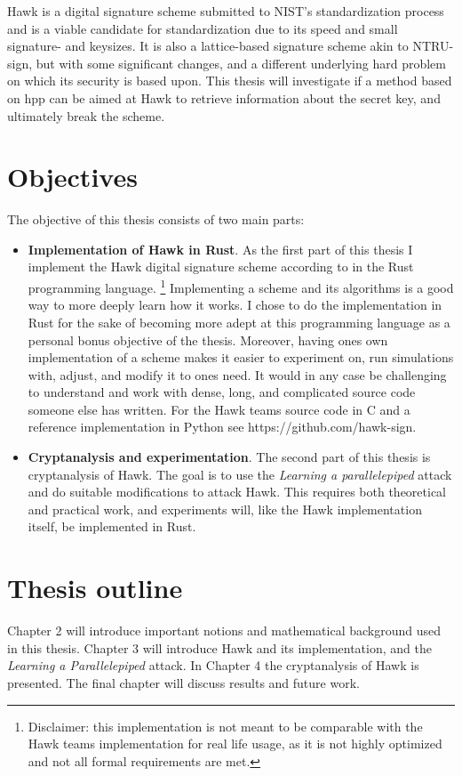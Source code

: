 Hawk \cite{HawkSpec24} is a digital signature scheme submitted to NIST's standardization process and is a viable candidate for standardization
due to its speed and small signature- and keysizes. It is also a lattice-based signature scheme akin to NTRU-sign, but with some significant changes, and a different underlying hard problem on which its security is based upon. 
This thesis will investigate if a method based on \gls{hpp} can be aimed at Hawk to retrieve information about the secret key, and ultimately break the scheme.

\section{Objectives}
The objective of this thesis consists of two main parts:
\begin{itemize}
    \item \textbf{Implementation of Hawk in Rust}. As the first part of this thesis I implement the Hawk digital signature scheme according to \cite{HawkSpec24} in the Rust programming language.
        \footnote{Disclaimer: this implementation is not meant to be comparable with the Hawk teams implementation for real life usage, as it is not highly optimized and not all formal requirements are met.}
    Implementing a scheme and its algorithms is a good way to more deeply learn how it works. I chose to do the implementation in Rust for the sake of becoming more adept at this programming language as a personal bonus objective of the thesis.
    Moreover, having ones own implementation of a scheme makes it easier to experiment on, run simulations with, adjust, and modify it to ones need. It would in any case be challenging to understand and work with dense, long, 
    and complicated source code someone else has written. For the Hawk teams source code in C and a reference implementation in Python see https://github.com/hawk-sign.


\item \textbf{Cryptanalysis and experimentation}. The second part of this thesis is cryptanalysis of Hawk. The goal is to use the \textit{Learning a parallelepiped} attack and do suitable modifications to attack Hawk. 
    This requires both theoretical and practical work, and experiments will, like the Hawk implementation itself, be implemented in Rust.
\end{itemize}
\section{Thesis outline}
Chapter 2 will introduce important notions and mathematical background used in this thesis. Chapter 3 will introduce Hawk and its implementation, and the \textit{Learning a Parallelepiped} attack.
In Chapter 4 the cryptanalysis of Hawk is presented. The final chapter will discuss results and future work.

